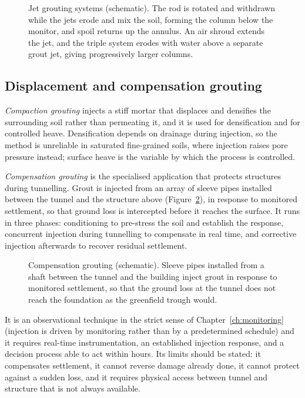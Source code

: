 \begin{figure}[htbp]
\centering
{}
\caption{Jet grouting systems (schematic). The rod is rotated and withdrawn while the jets erode and mix the soil, forming the column below the monitor, and spoil returns up the annulus. An air shroud extends the jet, and the triple system erodes with water above a separate grout jet, giving progressively larger columns.}
\label{fig:jet-grouting}
\end{figure}

\subsection{Displacement and compensation grouting}
\label{sec:displacement-compensation}

\emph{Compaction grouting} injects a stiff mortar that displaces and densifies
the surrounding soil rather than permeating it, and it is used for
densification and for controlled heave. Densification depends on drainage
during injection, so the method is unreliable in saturated fine-grained soils,
where injection raises pore pressure instead; surface heave is the variable
by which the process is controlled.

\emph{Compensation grouting} is the specialised application that protects
structures during tunnelling. Grout is injected from an array of sleeve pipes
installed between the tunnel and the structure above
(Figure~\ref{fig:compensation-grouting}), in response to
monitored settlement, so that ground loss is intercepted before it reaches the
surface. It runs in three phases: conditioning to pre-stress the soil and
establish the response, concurrent injection during tunnelling to compensate
in real time, and corrective injection afterwards to recover residual
settlement.

\begin{figure}[htbp]
\centering
{}
\caption{Compensation grouting (schematic). Sleeve pipes installed from a shaft between the tunnel and the building inject grout in response to monitored settlement, so that the ground loss at the tunnel does not reach the foundation as the greenfield trough would.}
\label{fig:compensation-grouting}
\end{figure}

It is an observational technique in the strict sense of
Chapter~\ref{ch:monitoring} (injection is driven
by monitoring rather than by a predetermined schedule) and it requires
real-time instrumentation, an established injection response, and a decision
process able to act within hours. Its limits should be stated: it compensates
settlement, it cannot reverse damage already done, it cannot protect against a
sudden loss, and it requires physical access between tunnel and structure that
is not always available.

